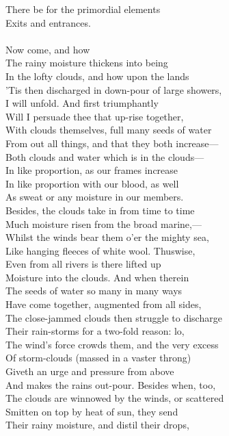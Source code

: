 There be for the primordial elements\\
Exits and entrances.\\
\\
Now come, and how\\
The rainy moisture thickens into being\\
In the lofty clouds, and how upon the lands\\
'Tis then discharged in down-pour of large showers,\\
I will unfold. And first triumphantly\\
Will I persuade thee that up-rise together,\\
With clouds themselves, full many seeds of water\\
From out all things, and that they both increase—\\
Both clouds and water which is in the clouds—\\
In like proportion, as our frames increase\\
In like proportion with our blood, as well\\
As sweat or any moisture in our members.\\
Besides, the clouds take in from time to time\\
Much moisture risen from the broad marine,—\\
Whilst the winds bear them o'er the mighty sea,\\
Like hanging fleeces of white wool. Thuswise,\\
Even from all rivers is there lifted up\\
Moisture into the clouds. And when therein\\
The seeds of water so many in many ways\\
Have come together, augmented from all sides,\\
The close-jammed clouds then struggle to discharge\\
Their rain-storms for a two-fold reason: lo,\\
The wind's force crowds them, and the very excess\\
Of storm-clouds (massed in a vaster throng)\\
Giveth an urge and pressure from above\\
And makes the rains out-pour. Besides when, too,\\
The clouds are winnowed by the winds, or scattered\\
Smitten on top by heat of sun, they send\\
Their rainy moisture, and distil their drops,\\
